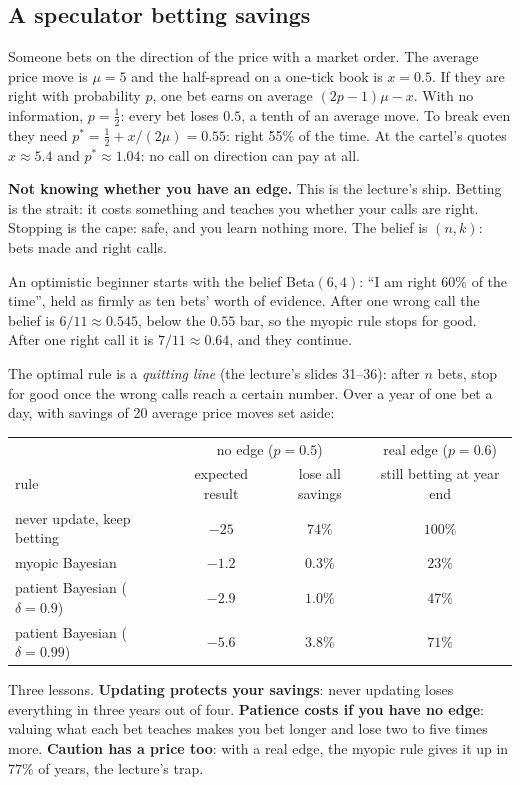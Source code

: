 \documentclass[11pt]{article}
\begin{document}
\subsection{A speculator betting savings}
\begin{example}
Someone bets on the direction of the price with a market order. The average price move is $\mu=5$ and
the half-spread on a one-tick book is $x=0.5$. If they are right with probability $p$, one bet earns on
average $(2p-1)\mu-x$. With no information, $p=\tfrac12$: every bet loses $0.5$, a tenth of an average
move. To break even they need $p^*=\tfrac12+x/(2\mu)=0.55$: right 55\% of the time. At the cartel's
quotes $x\approx5.4$ and $p^*\approx1.04$: no call on direction can pay at all.
\end{example}
\textbf{Not knowing whether you have an edge.} This is the lecture's ship. Betting is the strait: it costs
something and teaches you whether your calls are right. Stopping is the cape: safe, and you learn nothing
more. The belief is $(n,k)$: bets made and right calls.
\begin{example}
An optimistic beginner starts with the belief Beta$(6,4)$: ``I am right 60\% of the time'', held as firmly
as ten bets' worth of evidence. After one wrong call the belief is $6/11\approx0.545$, below the $0.55$ bar,
so the myopic rule stops for good. After one right call it is $7/11\approx0.64$, and they continue.
\end{example}
The optimal rule is a \emph{quitting line} (the lecture's slides 31--36): after $n$ bets, stop for good once
the wrong calls reach a certain number. Over a year of one bet a day, with savings of 20 average price
moves set aside:
\begin{center}
\begin{tabular}{lccc}
\toprule
& \multicolumn{2}{c}{no edge ($p=0.5$)} & real edge ($p=0.6$) \\
rule & expected result & lose all savings & still betting at year end \\
\midrule
never update, keep betting & $-25$ & $74\%$ & $100\%$ \\
myopic Bayesian & $-1.2$ & $0.3\%$ & $23\%$ \\
patient Bayesian ($\delta=0.9$) & $-2.9$ & $1.0\%$ & $47\%$ \\
patient Bayesian ($\delta=0.99$) & $-5.6$ & $3.8\%$ & $71\%$ \\
\bottomrule
\end{tabular}
\end{center}
Three lessons. \textbf{Updating protects your savings}: never updating loses everything in three years
out of four. \textbf{Patience costs if you have no edge}: valuing what each bet teaches makes you bet
longer and lose two to five times more. \textbf{Caution has a price too}: with a real edge, the myopic rule
gives it up in $77\%$ of years, the lecture's trap.
\end{document}
